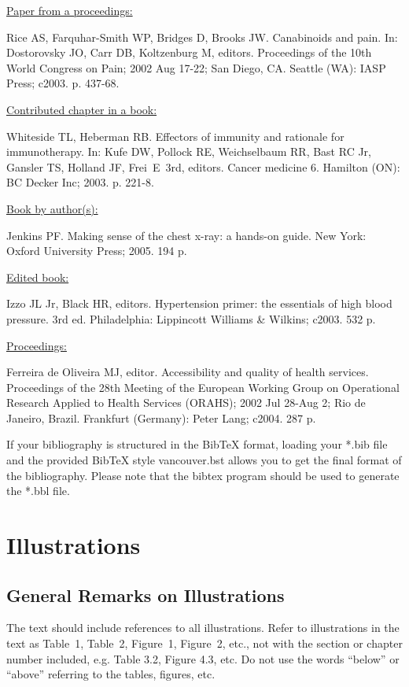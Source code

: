 \documentclass{IOS-Book-Article}
\begin{document}
\medskip
\noindent\ul{Paper from a proceedings:}\par\noindent
Rice AS, Farquhar-Smith WP, Bridges D, Brooks JW. Canabinoids and pain. In: Dostorovsky
JO, Carr DB, Koltzenburg M, editors. Proceedings of the 10th World Congress on Pain;
2002 Aug 17-22; San Diego, CA. Seattle (WA): IASP Press; c2003. p. 437-68.

\medskip
\noindent\ul{Contributed chapter in a book:}\par\noindent
Whiteside TL, Heberman RB. Effectors of immunity and rationale for immunotherapy. In:
Kufe DW, Pollock RE, Weichselbaum RR, Bast RC Jr, Gansler TS, Holland JF, Frei~E~3rd,
editors. Cancer medicine 6. Hamilton (ON): BC Decker Inc; 2003. p. 221-8.

\smallskip
\noindent\ul{Book by author(s):}\par\noindent
Jenkins PF. Making sense of the chest x-ray: a hands-on guide. New York: Oxford
University Press; 2005. 194 p.

\smallskip
\noindent\ul{Edited book:}\par\noindent
Izzo JL Jr, Black HR, editors. Hypertension primer: the essentials of high blood pressure.
3rd ed. Philadelphia: Lippincott Williams \& Wilkins; c2003. 532 p.

\smallskip
\noindent\ul{Proceedings:}\par\noindent
Ferreira de Oliveira MJ, editor. Accessibility and quality of health services. Proceedings of
the 28th Meeting of the European Working Group on Operational Research Applied to Health
Services (ORAHS); 2002 Jul 28-Aug 2; Rio de Janeiro, Brazil. Frankfurt (Germany): Peter Lang;
c2004. 287 p.

\vspace*{6pt}
If your bibliography is structured in the BibTeX format, loading your *.bib file and the provided  BibTeX style vancouver.bst allows you to get the final format of the bibliography. Please note that the bibtex program should be used to generate the *.bbl file.

\section{Illustrations}

\subsection{General Remarks on Illustrations}
The text should include references to all illustrations. Refer to illustrations in the
text as Table~1, Table~2, Figure~1, Figure~2, etc., not with the section or chapter number
included, e.g. Table 3.2, Figure 4.3, etc. Do not use the words ``below'' or ``above''
referring to the tables, figures, etc.
\end{document}
